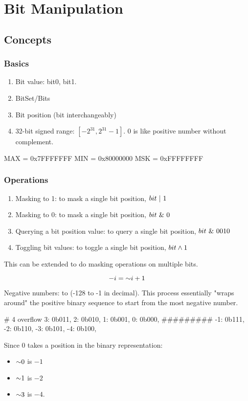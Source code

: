 \chapter{Bit Manipulation}
\section{Concepts}
\subsection{Basics}
\begin{enumerate}
\item Bit value: bit0, bit1. 
\item BitSet/Bits
\item Bit position (bit interchangeably)
\item 32-bit signed range: $[-2^{31}, 2^{31}-1]$. $0$ is like positive number without complement. 
\end{enumerate}
\begin{python}
MAX = 0x7FFFFFFF
MIN = 0x80000000
MSK = 0xFFFFFFFF
\end{python}
\subsection{Operations}
\begin{enumerate}
\item Masking to 1: to mask a single bit position, $bit\ |\  1$
\item Masking to 0: to mask a single bit position, $bit\ \&\  0$
\item Querying a bit position value: to query a single bit position, $bit\ \&\  0010$
\item Toggling bit values: to toggle a single bit position, $bit\wedge 1$
\end{enumerate}
This can be extended to do masking operations on multiple bits. 

$$
-i = \mathord{\sim} i+1
$$

Negative numbers:  to  (-128 to -1 in decimal). This process essentially "wraps around" the positive binary sequence to start from the most negative number. 

\begin{python}
{
  # 4 overflow
  3: 0b011,
  2: 0b010,
  1: 0b001,
  0: 0b000,
  #########
 -1: 0b111, 
 -2: 0b110,
 -3: 0b101,
 -4: 0b100,
}
\end{python}
Since 0 takes a position in the binary representation:
\begin{itemize}
\item $\mathord{\sim}0$ is $-1$
\item $\mathord{\sim}1$ is $-2$
\item $\mathord{\sim}3$ is $-4$.
\end{itemize}


